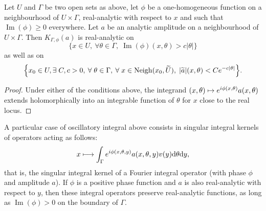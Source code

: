 \documentclass[10pt]{amsart}
\theoremstyle{definition}\newtheorem{defi}[theo]{Definition}\newtheorem{rema}[theo]{Remark}\newtheorem{exam}[theo]{Example}\newtheorem{exem}[theo]{Example}\newtheorem{nota}[theo]{Notation}
\DeclareMathOperator{\im}{Im}
\DeclareMathOperator{\Neigh}{Neigh}
\newcommand\1{\mathds{1}}
\newcommand{\dd}{\mathrm{d}}
\let\oldexists\exists
\renewcommand*{\exists}{\mathrel{\oldexists}}
\let\oldforall\forall
\renewcommand*{\forall}{\mathrel{\oldforall}}
\let\oldmapsto\mapsto
\renewcommand*{\mapsto}{\mathchoice{\longmapsto}{\oldmapsto}{\oldmapsto}{\oldmapsto}}
\let\originalleft\left
\let\originalright\right
\renewcommand{\left}{\mathopen{}\mathclose\bgroup\originalleft}
\renewcommand{\right}{\aftergroup\egroup\originalright}
\begin{document}
\begin{prop}\label{prop:pos_phase_reg_int}
Let $U$ and $\Gamma$ be two open sets as above, let $\phi$ be a one-homogeneous function on a neighbourhood of $U\times \Gamma$, real-analytic with respect to $x$ and such that $\im(\phi)\geq 0$ everywhere. Let $a$ be an analytic amplitude on a neighbourhood of $U\times \Gamma$. Then $K_{\Gamma,\phi}(a)$ is real-analytic on
\[
\{x\in U, \:\forall \theta\in \Gamma,\;
\im(\phi)(x,\theta)>c|\theta|\}
\]
as well as on
\[
\left\{x_0\in U, \exists C,c>0,\:\forall \theta\in \Gamma,\: \forall x\in \Neigh(x_0,\widetilde{U}),\; |\widetilde{a}|(x,\theta)<Ce^{-c|\theta|}\right\}.
\]
\end{prop}
\begin{proof}
Under either of the conditions above, the integrand $(x,\theta)\mapsto e^{i\phi(x,\theta)}a(x,\theta)$ extends holomorphically into an integrable function of $\theta$ for $x$ close to the real locus.
\end{proof}

A particular case of oscillatory integral above consists in singular integral kernels of operators acting as follows:
\begin{equation}\label{eq:local_FIO}
x\mapsto \int_{\Gamma} e^{i\phi(x,\theta,y)}a(x,\theta,y)v(y)\dd \theta \dd y,
\end{equation}
that is, the singular integral kernel of a Fourier integral operator (with phase $\phi$ and amplitude $a$). If $\phi$ is a positive phase function and $a$ is also real-analytic with respect to $y$, then these integral operators preserve real-analytic functions, as long as $\im(\phi)>0$ on the boundary of $\Gamma$.
\end{document}
